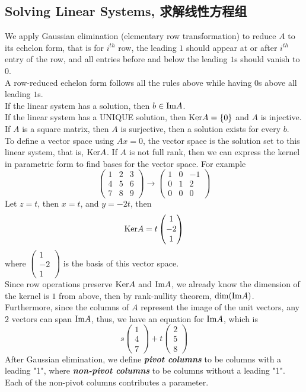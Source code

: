 \subsection{Solving Linear Systems, 求解线性方程组}
We apply Gaussian elimination (elementary row transformation) to reduce $A$ to its echelon form, that is for $i^{th}$ row, the leading $1$ should appear at or after $i^{th}$ entry of the row, and all entries before and below the leading $1$s should vanish to $0$. \\
A row-reduced echelon form follows all the rules above while having $0$s above all leading $1$s. \\
If the linear system has a solution, then $b \in \text{Im} A$. \\
If the linear system has a UNIQUE solution, then $\text{Ker} A = \{0\}$ and $A$ is injective. \\
If $A$ is a square matrix, then $A$ is surjective, then a solution exists for every $b$. \\
To define a vector space using $Ax = 0$, the vector space is the solution set to this linear system, that is, $\text{Ker} A$. If $A$ is not full rank, then we can express the kernel in parametric form to find bases for the vector space. For example
$$\begin{pmatrix}
    1 & 2 & 3 \\
    4 & 5 & 6 \\
    7 & 8 & 9
\end{pmatrix}
\to
\begin{pmatrix}
    1 & 0 & -1 \\
    0 & 1 & 2 \\
    0 & 0 & 0
\end{pmatrix}$$
Let $z = t$, then $x = t$, and $y = -2t$, then
$$\text{Ker} A = t \begin{pmatrix}
    1 \\
    -2 \\
    1
\end{pmatrix}$$
where $\begin{pmatrix}
    1 \\
    -2 \\
    1
\end{pmatrix}$ is the basis of this vector space. \\
Since row operations preserve $\text{Ker} A$ and $\text{Im} A$, we already know the dimension of the kernel is $1$ from above, then by rank-nullity theorem, $\dim (\text{Im} A)$. Furthermore, since the columns of $A$ represent the image of the unit vectors, any $2$ vectors can span $\text{Im} A$, thus, we have an equation for $\text{Im} A$, which is
$$s\begin{pmatrix}
    1 \\
    4 \\
    7
\end{pmatrix} + t \begin{pmatrix}
    2 \\
    5 \\
    8
\end{pmatrix}$$
After Gaussian elimination, we define \textbf{\textit{pivot columns}} to be columns with a leading "1", where \textbf{\textit{non-pivot columns}} to be columns without a leading "1". Each of the non-pivot columns contributes a parameter.

